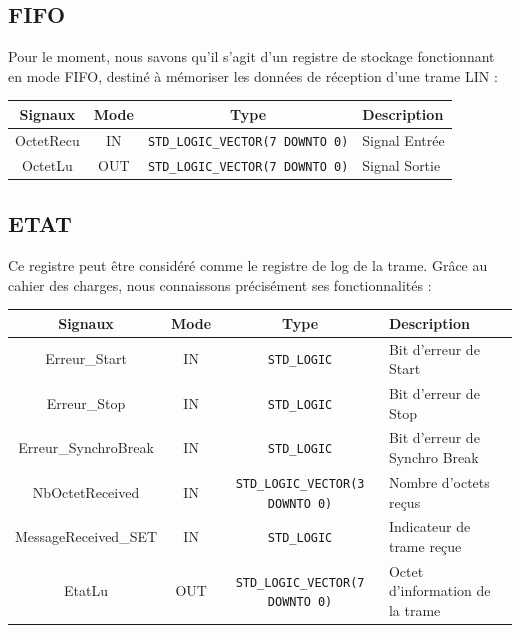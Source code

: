 \subsection{FIFO}

Pour le moment, nous savons qu’il s’agit d’un registre de stockage fonctionnant en mode FIFO, destiné à mémoriser les données de réception d’une trame LIN : 

\begin{center}
\renewcommand{\arraystretch}{1.2} %
\small %
\begin{tabularx}{\textwidth}{|c||c|c|X|}
    \hline
    \textbf{Signaux} & \textbf{Mode} & \textbf{Type} & \textbf{Description} \\ \hline
    OctetRecu & IN & \texttt{STD\_LOGIC\_VECTOR(7 DOWNTO 0)} & Signal Entrée \\
    OctetLu & OUT & \texttt{STD\_LOGIC\_VECTOR(7 DOWNTO 0)} & Signal Sortie \\
    \hline
\end{tabularx}
\end{center}

\subsection{ETAT}

Ce registre peut être considéré comme le registre de log de la trame. Grâce au cahier des charges, nous connaissons précisément ses fonctionnalités :

\begin{center}
\renewcommand{\arraystretch}{1.2} %
\small %
\begin{tabularx}{\textwidth}{|c||c|c|X|}
    \hline			
    \textbf{Signaux} & \textbf{Mode} & \textbf{Type} & \textbf{Description}  \\ \hline 
    Erreur\_Start & IN & \texttt{STD\_LOGIC} & Bit d'erreur de Start \\
    Erreur\_Stop & IN & \texttt{STD\_LOGIC} & Bit d'erreur de Stop \\
    Erreur\_SynchroBreak & IN & \texttt{STD\_LOGIC} & Bit d'erreur de Synchro Break \\
    NbOctetReceived & IN & \texttt{STD\_LOGIC\_VECTOR(3 DOWNTO 0)} & Nombre d'octets reçus \\
    MessageReceived\_SET & IN & \texttt{STD\_LOGIC} & Indicateur de trame reçue \\
    EtatLu & OUT & \texttt{STD\_LOGIC\_VECTOR(7 DOWNTO 0)} & Octet d'information de la trame \\
    \hline  
\end{tabularx}
\end{center}

